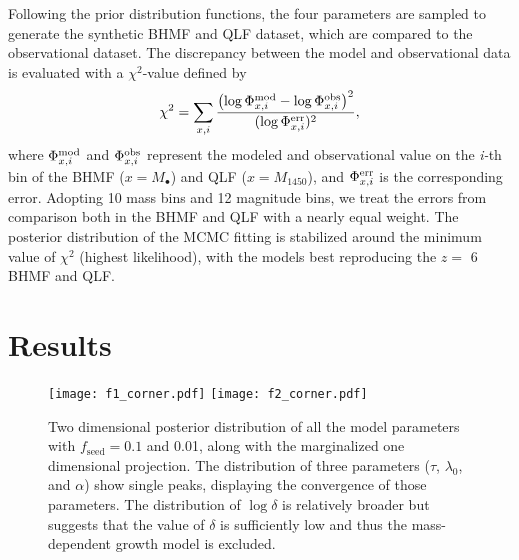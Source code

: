 \documentclass[twocolumn, twocolappendix]{aastex63}
\newcommand{\Mbh}{M_\bullet}
\newcommand{\fseed}{f_\mathrm{seed}}
\newcommand{\Muv}{M_{1450}}
\begin{document}
\begin{CJK*}{UTF8}{gbsn}
  

Following the prior distribution functions, the four parameters are sampled to generate the synthetic 
BHMF and QLF dataset, which are compared to the observational dataset. 
The discrepancy between the model and observational data is evaluated with a $\chi^2$-value defined by
%
\begin{align}
  \chi^2 = \sum_{x,i}
  \frac{\left(\log{\Phi^{\rm mod}_{x,i}} - \log{\Phi^{\rm obs}_{x,i}}\right)^2}{(\log{\Phi^{\rm err}_{x,i}})^2},
\end{align}
%
where $\Phi^{\rm mod}_{x,i}$ and $\Phi^{\rm obs}_{x,i}$ represent the modeled and observational value 
on the \textit{i-}th bin of the BHMF ($x=\Mbh$) and QLF ($x=\Muv$), and $\Phi^{\rm err}_{x,i}$ is the corresponding error.
Adopting 10 mass bins and 12 magnitude bins, we treat the errors from comparison both in the BHMF and QLF
with a nearly equal weight.
The posterior distribution of the MCMC fitting is stabilized around the minimum value of $\chi^2$ (highest likelihood), 
with the models best reproducing the $z=$ 6 BHMF and QLF.



\vspace{2mm}
\section{Results}\label{sec:fitting_result}




\begin{figure*}
\centering
\texttt{[image: f1\_corner.pdf]}
\texttt{[image: f2\_corner.pdf]}
\caption{
Two dimensional posterior distribution of all the model parameters with $\fseed=0.1$ and 0.01, 
along with the marginalized one dimensional projection.
The distribution of three parameters ($\tau$, $\lambda_0$, and $\alpha$) show single peaks,
displaying the convergence of those parameters.
The distribution of $\log\delta$ is relatively broader but suggests that the value of $\delta$
is sufficiently low and thus the mass-dependent growth model is excluded.
}
\label{fig:contour}
\vspace{5mm}
\end{figure*}
%



\end{CJK*}
\end{document}
